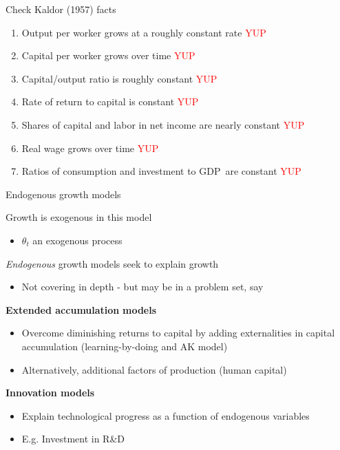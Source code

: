 \begin{frame}{Check Kaldor (1957) facts}

\begin{enumerate}
\item Output per worker grows at a roughly constant rate \textcolor{red}{YUP}
\item Capital per worker grows over time \textcolor{red}{YUP}
\item Capital/output ratio is roughly constant \textcolor{red}{YUP}
\item Rate of return to capital is constant \textcolor{red}{YUP}
\item Shares of capital and labor in net income are nearly constant \textcolor{red}{YUP}
\item Real wage grows over time \textcolor{red}{YUP}
\item Ratios of consumption and investment to GDP\ are constant \textcolor{red}{YUP}
\end{enumerate}

\end{frame}


\begin{frame}{Endogenous growth models}

Growth is exogenous in this model
	\begin{itemize}
	\item	$\theta_{t}$ an exogenous process
	\end{itemize}
\vspace{2mm}
\textit{Endogenous} growth models seek to explain growth
	\begin{itemize}
	\item	Not covering in depth - but may be in a problem set, say
	\end{itemize}
\vspace{2mm}
\textbf{Extended accumulation} \textbf{models}
	\begin{itemize}
	\item	Overcome diminishing returns to capital by adding externalities in capital accumulation (learning-by-doing and AK model)
	\item	Alternatively, additional factors of production (human capital)
	\end{itemize}
\vspace{2mm}
\textbf{Innovation models}
	\begin{itemize}
	\item	Explain technological progress as a function of endogenous variables
	\item	E.g. Investment in R\&D
	\end{itemize}

\end{frame}

